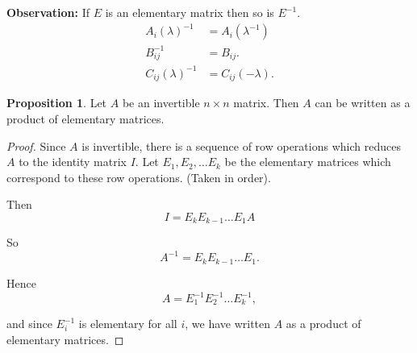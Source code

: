 \documentclass{article}
\theoremstyle{definition} \newtheorem*{definition}{Definition}
\newtheorem{proposition}[theorem]{Proposition}
\begin{document}
  \textbf{Observation:} If $E$ is an elementary matrix then so is $E^{-1}$.
  \begin{align*}
    A_i(\lambda)^{-1} &= A_i(\lambda^{-1}) \\ B_{ij}^{-1} &= B_{ij}.\\
    C_{ij}(\lambda)^{-1} &= C_{ij}(-\lambda).
  \end{align*}

  \begin{proposition}
    Let $A$ be an invertible $n \times n$ matrix. Then $A$ can be written as
    a product of elementary matrices.
  \end{proposition}

  \begin{proof}
    Since $A$ is invertible, there is a sequence of row operations which 
    reduces $A$ to the identity matrix $I$. Let $E_1,E_2, \dots E_k$
    be the elementary matrices which correspond to these row operations.
    (Taken in order).

    Then \[
      I = E_k E_{k-1}\dots E_1 A
    \]

    So \[
      A^{-1} = E_k E_{k-1} \dots E_1.
    \]

    Hence
    \[
      A = E_1^{-1}E_2^{-1} \dots E_k^{-1},
    \]

    and since $E_i^{-1}$ is elementary for all $i$, we have written $A$
    as a product of elementary matrices.
  \end{proof}
\end{document}
